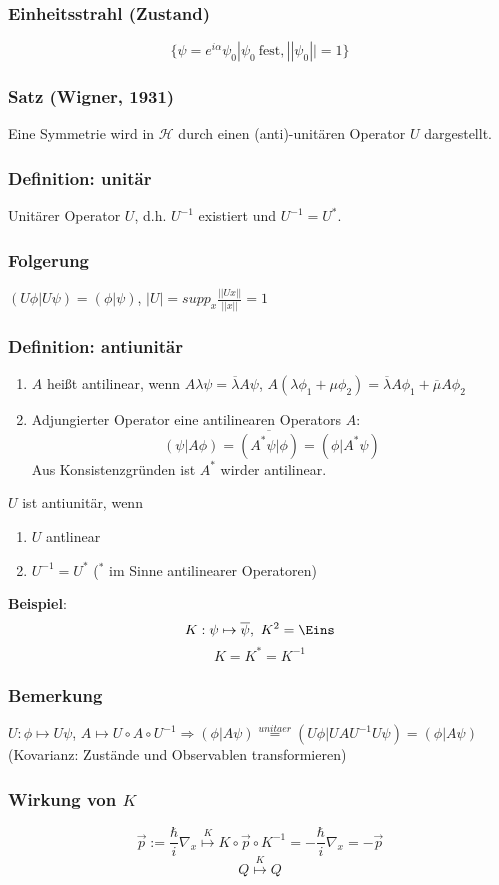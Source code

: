 \documentclass[twoside,a4paper]{scrartcl}
\renewcommand{\1}{\mathds{1}}
\newcommand{\Ra}{\Rightarrow}
\renewcommand{\l}{\lambda}
\renewcommand{\H}{\mathcal{H}}
\begin{document}
\subsubsection*{Einheitsstrahl (Zustand)}
$$\{\psi=e^{i\alpha}\psi_0|\psi_0 \ \mathrm{fest}, ||\psi_0||=1\}$$
\subsubsection*{Satz (Wigner, 1931)}
Eine Symmetrie wird in $\H$ durch einen (anti)-unitären Operator $U$ dargestellt.
\subsubsection*{Definition: unitär}
Unitärer Operator $U$, d.h. $U^{-1}$ existiert und $U^{-1}=U^*$.
\subsubsection*{Folgerung}
$(U\phi|U\psi)=(\phi|\psi)$, $|U|=supp_x \frac{||Ux||}{||x||}=1$
\subsubsection*{Definition: antiunitär}
\begin{enumerate}
\item $A$ heißt antilinear, wenn $A\l \psi=\overline{\l} A \psi$, $A(\l \phi_1+\mu \phi_2)=\overline{\l} A \phi_1+ \overline{\mu}A\phi_2$
\item Adjungierter Operator eine antilinearen Operators $A$:
$$(\psi|A\phi)=\overline{(A^*\psi|\phi)}=(\phi|A^*\psi)$$
Aus Konsistenzgründen ist $A^*$ wirder antilinear.
\end{enumerate}
$U$ ist antiunitär, wenn
\begin{enumerate}
\item $U$ antlinear
\item $U^{-1}=U^*$ ($^*$ im Sinne antilinearer Operatoren)
\end{enumerate}
\textbf{Beispiel}:\\
$$K: \psi \mapsto \overline{\psi}, \ K^2=\Eins$$
$$K=K^*=K^{-1}$$
\subsubsection*{Bemerkung}
$U: \phi \mapsto U\psi$, $A \mapsto U \circ A \circ U^{-1} \Ra (\phi|A\psi)\stackrel{unitaer}{=}(U\phi|UAU^{-1}U\psi)=(\phi|A\psi)$
(Kovarianz: Zustände und Observablen transformieren)
\subsubsection*{Wirkung von $K$}
$$\vec p:= \frac{\hbar}{i}\nabla_x \stackrel{K}{\mapsto} K \circ \vec p \circ K^{-1}=-\frac{\hbar}{i} \nabla_x=-\vec p$$
$$Q \stackrel{K}{\mapsto}  Q$$
\end{document}
